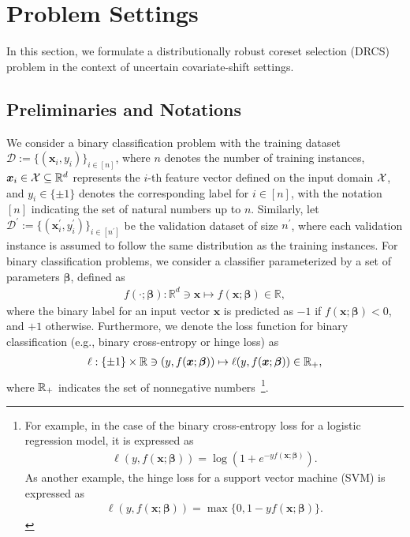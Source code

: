 
\section{Problem Settings}
\label{sec:problem-settings}
%
In this section, we formulate a distributionally robust coreset selection (DRCS) problem in the context of uncertain covariate-shift settings.

\subsection{Preliminaries and Notations}
%
We consider a binary classification problem with the training dataset ${\mathcal D} := \{(\bm x_i, y_i)\}_{i \in [n]}$, where $n$ denotes the number of training instances, $\bm x_i \in {\mathcal X} \subseteq {\mathbb R}^d$ represents the $i$-th feature vector defined on the input domain ${\mathcal X}$, and $y_i \in \{\pm 1\}$ denotes the corresponding label for $i \in [n]$, with the notation $[n]$ indicating the set of natural numbers up to $n$.  
%
Similarly, let ${\mathcal D}^\prime := \{(\bm x_i^\prime, y_i^\prime)\}_{i \in [n^\prime]}$ be the validation dataset of size $n^\prime$, where each validation instance is assumed to follow the same distribution as the training instances.
%
For binary classification problems, we consider a classifier parameterized by a set of parameters $\bm \beta$, defined as  
\begin{align}  
\label{eq:classifier}  
f(\cdot; \bm \beta): \mathbb{R}^d \ni \bm x \mapsto f(\bm x; \bm \beta) \in \mathbb{R},  
\end{align}  
where the binary label for an input vector $\bm x$ is predicted as $-1$ if $f(\bm x; \bm \beta) < 0$, and $+1$ otherwise.  
%
Furthermore, we denote the loss function for binary classification (e.g., binary cross-entropy or hinge loss) as
\begin{align}
 \label{eq:loss_func}
 \ell: \{\pm 1\} \times \mathbb{R} \ni (y, f(\bm x; \bm \beta)) \mapsto \ell(y, f(\bm x; \bm \beta)) \in \mathbb{R}_+,
\end{align}
where $\mathbb{R}_+$ indicates the set of nonnegative numbers~\footnote{
%
For example, in the case of the binary cross-entropy loss for a logistic regression model, it is expressed as  
\begin{align*}  
\ell(y, f(\bm x; \bm \beta)) = \log (1 + e^{-y f(\bm x; \bm \beta)}).  
\end{align*}  
%
As another example, the hinge loss for a support vector machine (SVM) is expressed as  
\begin{align*}  
\ell(y, f(\bm x; \bm \beta)) = \max \{0, 1 - y f(\bm x; \bm \beta)\}.  
\end{align*}  
}.

